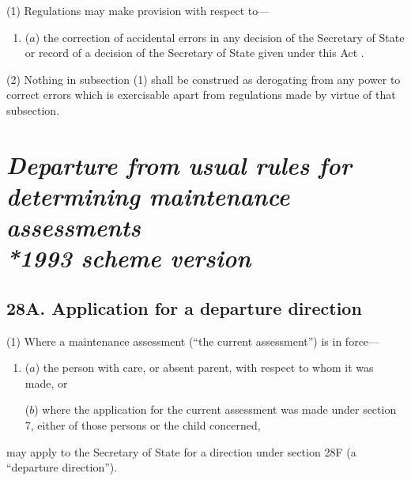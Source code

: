 \documentclass[12pt,a4paper]{article}
\begin{document}
(1) Regulations may make provision with respect to—
\begin{enumerate}\item[]
($a$) the correction of accidental errors in any decision 
of the Secretary of State  %
or record of a decision 
of the Secretary of State  %
given under this Act%
%
%
.
\end{enumerate}

(2) Nothing in subsection (1) shall be construed as derogating from any power to correct errors 
which is exercisable apart from regulations made by virtue of that subsection.


\section[\itshape Departure from usual rules for determining maintenance assessments --- \emph{1993 scheme version}]{\itshape Departure from usual rules for determining maintenance assessments\\*\emph{1993 scheme version}}

\subsection{28A. Application for a departure direction}

(1) Where a maintenance assessment (“the current assessment”) is in force—
\begin{enumerate}\item[]
($a$) the person with care, or absent parent, with respect to whom it was made, or

($b$) where the application for the current assessment was made under section 7, either of those persons or the child concerned,
\end{enumerate}
may apply to the Secretary of State for a direction under section 28F (a “departure direction”).
\end{document}
